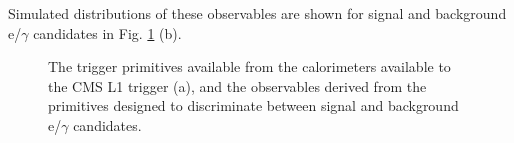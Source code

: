 Simulated distributions of these observables are shown for signal and background e/$\gamma$ candidates in Fig. \ref{fig:TriggerObservables} (b). 
\begin{figure}[t]
\caption{The trigger primitives available from the calorimeters available to the CMS L1 trigger (a), and the observables derived from the primitives designed to discriminate between signal and background e/$\gamma$ candidates.} 
\label{fig:TriggerObservables}
\end{figure}\FloatBarrier

